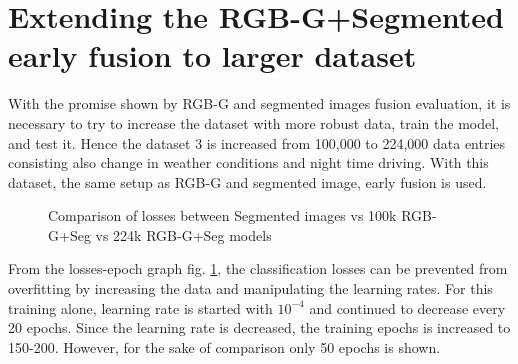\section{Extending the RGB-G+Segmented early fusion to larger dataset}
With the promise shown by RGB-G and segmented images fusion evaluation, it is necessary to
try to increase the dataset with more robust data, train the model, and test it. Hence the
dataset 3 is increased from 100,000 to 224,000 data entries consisting also change in
weather conditions and night time driving. With this dataset, the same setup as RGB-G and
segmented image, early fusion is used.
\begin{figure}[!ht]
    \centering
    \def\svgwidth{\textwidth}
    
    \caption{Comparison of losses between Segmented images vs 100k RGB-G+Seg vs 224k
    RGB-G+Seg models}
    \label{fig:224kdatafusionlosses2}
\end{figure}
From the losses-epoch graph fig. \ref{fig:224kdatafusionlosses2}, the classification
losses can be prevented from overfitting by increasing the data and manipulating the
learning rates. For this training alone, learning rate is started with $10^{-4}$ and
continued to decrease every 20 epochs. Since the learning rate is decreased, the training
epochs is increased to 150-200. However, for the sake of comparison only 50 epochs is
shown.

